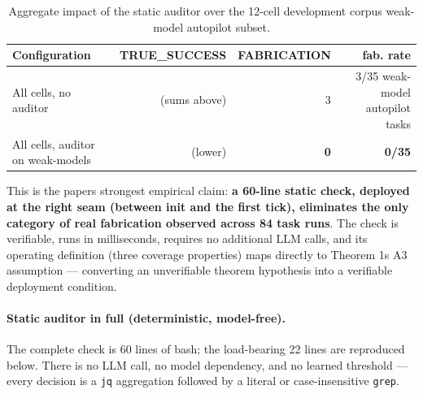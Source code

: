{\scriptsize\begin{longtable}[]{@{}lrrr@{}}
\caption{Aggregate impact of the static auditor over the 12-cell development corpus weak-model autopilot subset.}\label{tab:static-aggregate}\\
\toprule\noalign{}
Configuration & TRUE\_SUCCESS & FABRICATION & fab. rate \\
\midrule\noalign{}
\endhead
\bottomrule\noalign{}
\endlastfoot
All cells, no auditor & (sums above) & 3 & 3/35 weak-model autopilot tasks \\
All cells, auditor on weak-models & (lower) & \textbf{0} & \textbf{0/35} \\
\end{longtable}}

This is the paper\textquotesingle s strongest empirical claim: \textbf{a 60-line static check, deployed at the right
seam (between init and the first tick), eliminates the only category of real fabrication
observed across 84 task runs}. The check is verifiable, runs in milliseconds, requires no
additional LLM calls, and its operating definition (three coverage properties) maps directly to
Theorem 1\textquotesingle s A3 assumption --- converting an unverifiable theorem hypothesis into a verifiable
deployment condition.



\paragraph{Static auditor in full (deterministic, model-free).}
The complete check is 60 lines of bash; the load-bearing 22 lines are reproduced
below. There is no LLM call, no model dependency, and no learned threshold ---
every decision is a \texttt{jq} aggregation followed by a literal or
case-insensitive \texttt{grep}.

